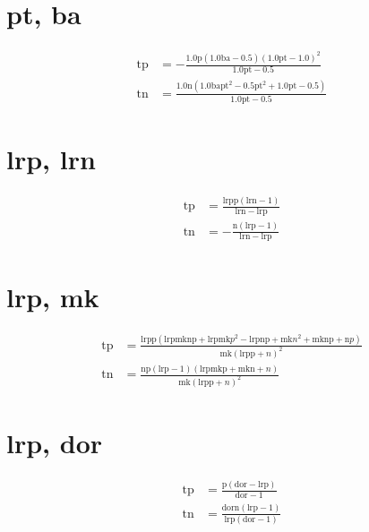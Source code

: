 \documentclass[3p,times]{elsarticle}
\begin{document}
\begin{footnotesize}
\begin{landscape}
\section{pt, ba}
\begin{align}
\mathrm{tp} &= - \frac{1.0 \mathrm{p} \left(1.0 \mathrm{ba} - 0.5\right) \left(1.0 \mathrm{pt} - 1.0\right)^{2}}{1.0 \mathrm{pt} - 0.5}\\
\mathrm{tn} &= \frac{1.0 \mathrm{n} \left(1.0 \mathrm{ba} \mathrm{pt}^{2} - 0.5 \mathrm{pt}^{2} + 1.0 \mathrm{pt} - 0.5\right)}{1.0 \mathrm{pt} - 0.5}
\end{align}
\section{lrp, lrn}
\begin{align}
\mathrm{tp} &= \frac{\mathrm{lrp} \mathrm{p} \left(\mathrm{lrn} - 1\right)}{\mathrm{lrn} - \mathrm{lrp}}\\
\mathrm{tn} &= - \frac{\mathrm{n} \left(\mathrm{lrp} - 1\right)}{\mathrm{lrn} - \mathrm{lrp}}
\end{align}
\section{lrp, mk}
\begin{align}
\mathrm{tp} &= \frac{\mathrm{lrp} \mathrm{p} \left(\mathrm{lrp} \mathrm{mk} \mathrm{n} \mathrm{p} + \mathrm{lrp} \mathrm{mk} p^{2} - \mathrm{lrp} \mathrm{n} \mathrm{p} + \mathrm{mk} n^{2} + \mathrm{mk} \mathrm{n} \mathrm{p} + \mathrm{n} p\right)}{\mathrm{mk} \left(\mathrm{lrp} \mathrm{p} + n\right)^{2}}\\
\mathrm{tn} &= \frac{\mathrm{n} \mathrm{p} \left(\mathrm{lrp} - 1\right) \left(\mathrm{lrp} \mathrm{mk} \mathrm{p} + \mathrm{mk} \mathrm{n} + n\right)}{\mathrm{mk} \left(\mathrm{lrp} \mathrm{p} + n\right)^{2}}
\end{align}
\section{lrp, dor}
\begin{align}
\mathrm{tp} &= \frac{\mathrm{p} \left(\mathrm{dor} - \mathrm{lrp}\right)}{\mathrm{dor} - 1}\\
\mathrm{tn} &= \frac{\mathrm{dor} \mathrm{n} \left(\mathrm{lrp} - 1\right)}{\mathrm{lrp} \left(\mathrm{dor} - 1\right)}
\end{align}

\end{landscape}
\end{footnotesize}
\end{document}
